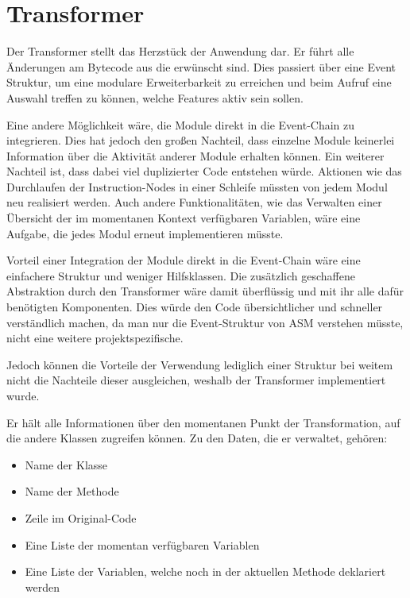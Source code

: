 \section{Transformer} 
\label{sec:trans}

Der Transformer stellt das Herzstück der Anwendung dar. Er führt alle Änderungen am Bytecode aus die erwünscht sind. Dies passiert über eine Event Struktur, um eine modulare Erweiterbarkeit zu erreichen und beim Aufruf eine Auswahl treffen zu können, welche Features aktiv sein sollen.

Eine andere Möglichkeit wäre, die Module direkt in die Event-Chain zu integrieren. Dies hat jedoch den großen Nachteil, dass einzelne Module keinerlei Information über die Aktivität anderer Module erhalten können. Ein weiterer Nachteil ist, dass dabei viel duplizierter Code entstehen würde. Aktionen wie das Durchlaufen der Instruction-Nodes in einer Schleife müssten von jedem Modul neu realisiert werden. Auch andere Funktionalitäten, wie das Verwalten einer Übersicht der im momentanen Kontext verfügbaren Variablen, wäre eine Aufgabe, die jedes Modul erneut implementieren müsste.

Vorteil einer Integration der Module direkt in die Event-Chain wäre eine einfachere Struktur und weniger Hilfsklassen. Die zusätzlich geschaffene Abstraktion durch den Transformer wäre damit überflüssig und mit ihr alle dafür benötigten Komponenten. Dies würde den Code übersichtlicher und schneller verständlich machen, da man nur die Event-Struktur von ASM verstehen müsste, nicht eine weitere projektspezifische.

Jedoch können die Vorteile der Verwendung lediglich einer Struktur bei weitem nicht die Nachteile dieser ausgleichen, weshalb der Transformer implementiert wurde.

Er hält alle Informationen über den momentanen Punkt der Transformation, auf die andere Klassen zugreifen können. Zu den Daten, die er verwaltet, gehören:

\begin{itemize}
	\item Name der Klasse
	\item Name der Methode
	\item Zeile im Original-Code
	\item Eine Liste der momentan verfügbaren Variablen
	\item Eine Liste der Variablen, welche noch in der aktuellen Methode deklariert werden
\end{itemize}

